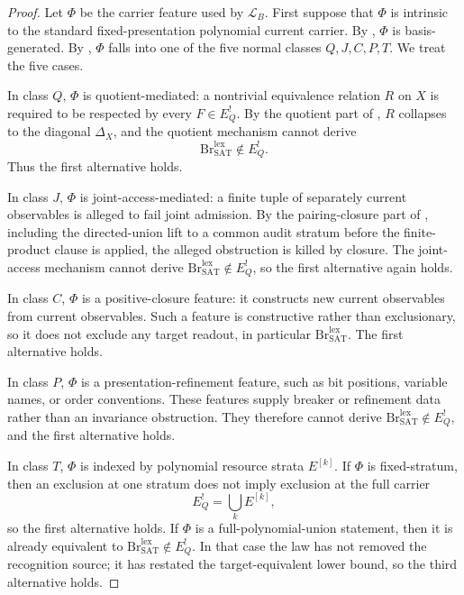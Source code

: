 \documentclass[11pt]{article}
\newcommand{\EQbang}{E^{!}_{Q}}
\theoremstyle{definition}
\begin{document}
\begin{proof}
Let \(\Phi\) be the carrier feature used by \(\mathcal L_B\).  First
suppose that \(\Phi\) is intrinsic to the standard fixed-presentation
polynomial current carrier.  By ,
\(\Phi\) is basis-generated.  By
, \(\Phi\) falls into one of
the five normal classes \(Q,J,C,P,T\).  We treat the five cases.

In class \(Q\), \(\Phi\) is quotient-mediated: a nontrivial
equivalence relation \(R\) on \(X\) is required to be respected by
every \(F\in\EQbang\).  By the quotient part of
, \(R\) collapses to the diagonal
\(\Delta_X\), and the quotient mechanism cannot derive
\[
  \mathrm{Br}^{\mathrm{lex}}_{\mathrm{SAT}}\notin\EQbang .
\]
Thus the first alternative holds.

In class \(J\), \(\Phi\) is joint-access-mediated: a finite tuple of
separately current observables is alleged to fail joint admission.  By
the pairing-closure part of ,
including the directed-union lift to a common audit stratum before the
finite-product clause is applied, the alleged obstruction is killed by
closure.  The joint-access mechanism cannot derive
\(\mathrm{Br}^{\mathrm{lex}}_{\mathrm{SAT}}\notin\EQbang\), so the
first alternative again holds.

In class \(C\), \(\Phi\) is a positive-closure feature: it constructs
new current observables from current observables.  Such a feature is
constructive rather than exclusionary, so it does not exclude any
target readout, in particular
\(\mathrm{Br}^{\mathrm{lex}}_{\mathrm{SAT}}\).  The first alternative
holds.

In class \(P\), \(\Phi\) is a presentation-refinement feature, such as
bit positions, variable names, or order conventions.  These features
supply breaker or refinement data rather than an invariance
obstruction.  They therefore cannot derive
\(\mathrm{Br}^{\mathrm{lex}}_{\mathrm{SAT}}\notin\EQbang\), and the
first alternative holds.

In class \(T\), \(\Phi\) is indexed by polynomial resource strata
\(E^{[k]}\).  If \(\Phi\) is fixed-stratum, then an exclusion at one
stratum does not imply exclusion at the full carrier
\[
  \EQbang=\bigcup_k E^{[k]},
\]
so the first alternative holds.  If \(\Phi\) is a full-polynomial-union
statement, then it is already equivalent to
\(\mathrm{Br}^{\mathrm{lex}}_{\mathrm{SAT}}\notin\EQbang\).  In that
case the law has not removed the recognition source; it has restated
the target-equivalent lower bound, so the third alternative holds.


\end{proof}
\end{document}
